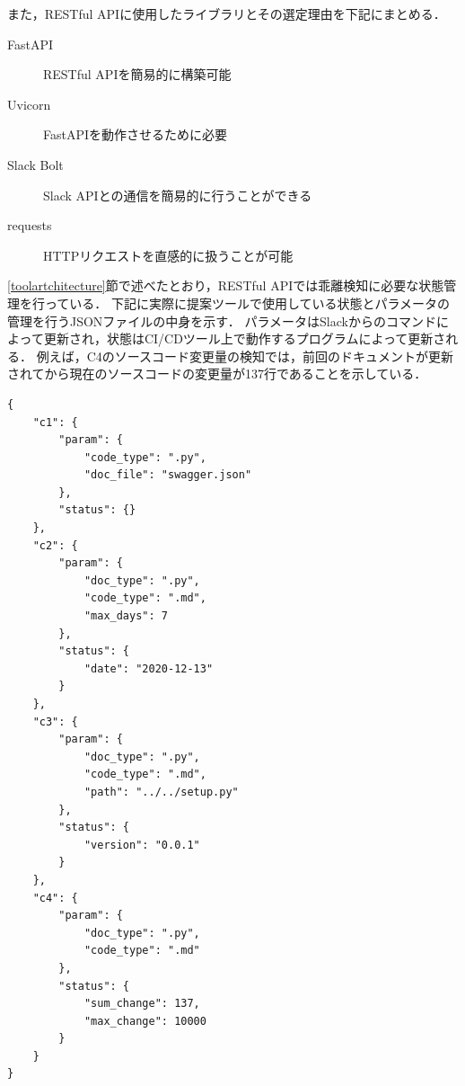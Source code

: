 また，RESTful APIに使用したライブラリとその選定理由を下記にまとめる．
\begin{description}
    \item[FastAPI] RESTful APIを簡易的に構築可能
    \item[Uvicorn] FastAPIを動作させるために必要
    \item[Slack Bolt] Slack APIとの通信を簡易的に行うことができる
    \item[requests] HTTPリクエストを直感的に扱うことが可能
\end{description}

\ref{toolartchitecture}節で述べたとおり，RESTful APIでは乖離検知に必要な状態管理を行っている．
下記に実際に提案ツールで使用している状態とパラメータの管理を行うJSONファイルの中身を示す．
パラメータはSlackからのコマンドによって更新され，状態はCI/CDツール上で動作するプログラムによって更新される．
例えば，C4のソースコード変更量の検知では，前回のドキュメントが更新されてから現在のソースコードの変更量が137行であることを示している．
\begin{lstlisting}[caption=状態とパラメメータの管理の例, label=status]
{
    "c1": {
        "param": {
            "code_type": ".py",
            "doc_file": "swagger.json"
        },
        "status": {}
    },
    "c2": {
        "param": {
            "doc_type": ".py",
            "code_type": ".md",
            "max_days": 7
        },
        "status": {
            "date": "2020-12-13"
        }
    },
    "c3": {
        "param": {
            "doc_type": ".py",
            "code_type": ".md",
            "path": "../../setup.py"
        },
        "status": {
            "version": "0.0.1"
        }
    },
    "c4": {
        "param": {
            "doc_type": ".py",
            "code_type": ".md"
        },
        "status": {
            "sum_change": 137,
            "max_change": 10000
        }
    }
}
\end{lstlisting}
    


